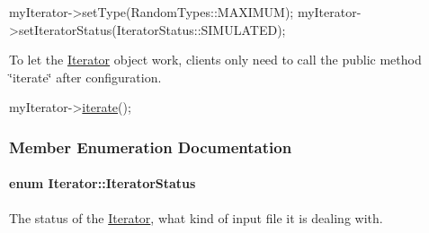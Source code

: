 \begin{DoxyCode}
myIterator->setType(RandomTypes::MAXIMUM);
myIterator->setIteratorStatus(IteratorStatus::SIMULATED);
\end{DoxyCode}


To let the \hyperlink{class_iterator}{Iterator} object work, clients only need to call the public method \char`\"{}iterate\char`\"{} after configuration.


\begin{DoxyCode}
myIterator->\hyperlink{class_iterator_a39dd825e64aad150068b7b482685f264}{iterate}();
\end{DoxyCode}
 

\subsubsection{Member Enumeration Documentation}
\hypertarget{class_iterator_a1eb24c519953c2a333ea4a345b0c679c}{
\paragraph[{Iterator\+Status}]{\setlength{\rightskip}{0pt plus 5cm}enum {\bf Iterator\+::\+Iterator\+Status}}}\label{class_iterator_a1eb24c519953c2a333ea4a345b0c679c}


The status of the \hyperlink{class_iterator}{Iterator}, what kind of input file it is dealing with. 

